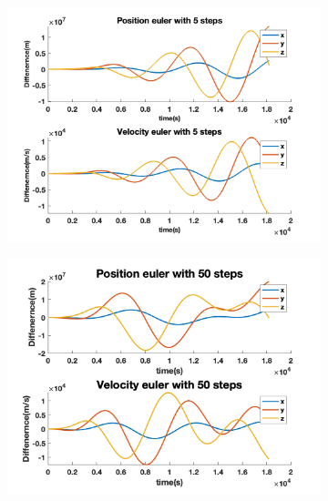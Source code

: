 \documentclass[12pt
,headinclude
,headsepline
,bibtotocnumbered
]{scrartcl}
\begin{document}
\begin{figure}[H]
    \centering
    \begin{subfigure}[b]{0.45\textwidth}
    \includegraphics[width=1\textwidth]{./plots/euler_5_yprime.png}
    \end{subfigure}
    \begin{subfigure}[b]{0.45\textwidth}
    \includegraphics[width=1\textwidth]{./plots/euler_50_yprime.png}
    \end{subfigure}
    \begin{subfigure}[b]{0.45\textwidth}

\end{subfigure}
\end{figure}
\end{document}
